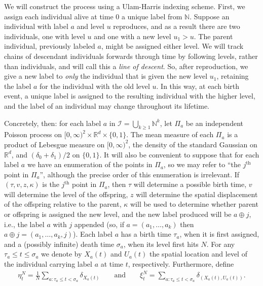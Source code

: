 \documentclass[12pt]{article}
\newcommand{\IR}{\mathbb R}
\newcommand{\IN}{\mathbb N}
\newcommand{\lp}{\xi}              %
\newcommand{\labelspace}{\mathcal{I}} %
\newcommand{\concat}{\oplus}   %
\numberwithin{equation}{section}
\begin{document}
We will construct the process using a Ulam-Harris indexing scheme.
First, we assign each individual alive at time 0 a unique label from $\IN$.
Suppose an individual with label $a$ and level $u$ reproduces,
and as a result there are two individuals, one with level $u$ and one with a new level $u_1 > u$.
The parent individual, previously labeled $a$, might be assigned either level.
We will track chains of descendant individuals forwards through time by
following levels, rather than individuals, and will call this a \emph{line of descent}.
So, after reproduction, we give a new label to \emph{only} the individual
that is given the new level $u_1$,
retaining the label $a$ for the individual with the old level $u$.
In this way, at each birth event, a unique label is 
assigned to the resulting individual with the higher level,
and the label of an individual may change throughout its lifetime.

Concretely, then: for each label $a$ in
$\labelspace = \bigcup_{k \ge 1} \IN^k$,
let $\Pi_a$ be an independent Poisson process on 
$[0, \infty)^2 \times \IR^d \times \{0,1\}$.
The mean measure of each $\Pi_a$ is a product of Lebesgue measure on $[0, \infty)^2$,
the density of the standard Gaussian on $\IR^d$, and 
$(\delta_0 + \delta_1)/2$ on $\{0, 1\}$.
It will also be convenient
to suppose that for each label $a$ we have an enumeration of the points in $\Pi_a$,
so we may refer to ``the $j^\text{th}$ point in $\Pi_a$'',
although the precise order of this enumeration is irrelevant.
If $(\tau, v, z, \kappa)$ is the $j^\text{th}$ point in $\Pi_a$,
then $\tau$ will determine a possible birth time,
$v$ will determine the level of the offspring,
$z$ will determine the spatial displacement of the offspring relative to the parent,
$\kappa$ will be used to determine whether parent or offspring is assigned the new level,
and the new label produced will be $a \concat j$,
i.e., the label $a$ with $j$ appended
(so, if $a = (a_1, \ldots, a_k)$ then $a \concat j = (a_1, \ldots, a_k, j)$).
Each label $a$ has a birth time $\tau_a$,
when it is first assigned,
and a (possibly infinite) death time $\sigma_a$, when its level first hits $N$.
For any $\tau_a \le t \le \sigma_a$ we denote by $X_a(t)$ and $U_a(t)$ the spatial location and level
of the individual carrying label $a$ at time $t$, respectively.
Furthermore, define
\begin{align*}
    \eta^N_t = \frac{1}{N} \sum_{a : \tau_a \le t < \sigma_a} \delta_{X_a(t)}
    \qquad \text{and} \qquad
    \lp^N_t = \sum_{a : \tau_a \le t < \sigma_a} \delta_{(X_a(t), U_a(t))} .
\end{align*}
\end{document}
